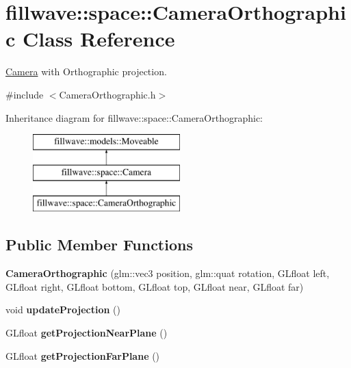 \hypertarget{classfillwave_1_1space_1_1CameraOrthographic}{}\section{fillwave\+:\+:space\+:\+:Camera\+Orthographic Class Reference}
\label{classfillwave_1_1space_1_1CameraOrthographic}


\hyperlink{classfillwave_1_1space_1_1Camera}{Camera} with Orthographic projection.  




{\ttfamily \#include $<$Camera\+Orthographic.\+h$>$}

Inheritance diagram for fillwave\+:\+:space\+:\+:Camera\+Orthographic\+:\begin{figure}[H]
\begin{center}
\leavevmode
\includegraphics[height=3.000000cm]{classfillwave_1_1space_1_1CameraOrthographic}
\end{center}
\end{figure}
\subsection*{Public Member Functions}
\begin{DoxyCompactItemize}
\item 
\hypertarget{classfillwave_1_1space_1_1CameraOrthographic_abc1f9cd4da3014e662ee8f4da74461ef}{}{\bfseries Camera\+Orthographic} (glm\+::vec3 position, glm\+::quat rotation, G\+Lfloat left, G\+Lfloat right, G\+Lfloat bottom, G\+Lfloat top, G\+Lfloat near, G\+Lfloat far)\label{classfillwave_1_1space_1_1CameraOrthographic_abc1f9cd4da3014e662ee8f4da74461ef}

\item 
\hypertarget{classfillwave_1_1space_1_1CameraOrthographic_a9702d624e347c4f895ca382af2f5f887}{}void {\bfseries update\+Projection} ()\label{classfillwave_1_1space_1_1CameraOrthographic_a9702d624e347c4f895ca382af2f5f887}

\item 
\hypertarget{classfillwave_1_1space_1_1CameraOrthographic_af7f315b1986a462ca6b91b2b9905d757}{}G\+Lfloat {\bfseries get\+Projection\+Near\+Plane} ()\label{classfillwave_1_1space_1_1CameraOrthographic_af7f315b1986a462ca6b91b2b9905d757}

\item 
\hypertarget{classfillwave_1_1space_1_1CameraOrthographic_afef849479a96b786837c556ef978d672}{}G\+Lfloat {\bfseries get\+Projection\+Far\+Plane} ()\label{classfillwave_1_1space_1_1CameraOrthographic_afef849479a96b786837c556ef978d672}

\end{DoxyCompactItemize}
